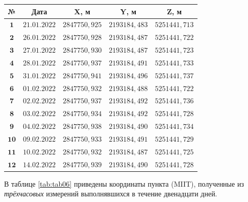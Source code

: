 \begin{table} [htbp]
	\centering\small
	\label{tab:tab05}{%
		\begin{tabular}{|c|c|c|c|c|}
			\hline
			\textbf{№} & \textbf{Дата} & \textbf{X, м} & \textbf{Y, м} & \textbf{Z, м} \\
			\hline
			\textbf{ $\mathbf{1}$} & $21.01.2022$ & $2847750,925$ & $2193184,483$ & $5251441,713$ \\
			\hline
			\textbf{ $\mathbf{2}$} & $26.01.2022$ & $2847750,928$ & $2193184,487$ & $5251441,722$ \\
			\hline
			\textbf{ $\mathbf{3}$} & $27.01.2022$ & $2847750,930$ & $2193184,487$ & $5251441,723$ \\
			\hline
			\textbf{ $\mathbf{4}$} & $28.01.2022$ & $2847750,937$ & $2193184,491$ & $5251441,733$ \\
			\hline
			\textbf{ $\mathbf{5}$} & $31.01.2022$ & $2847750,941$ & $2193184,496$ & $5251441,737$ \\
			\hline
			\textbf{ $\mathbf{6}$} & $01.02.2022$ & $2847750,932$ & $2193184,488$ & $5251441,722$ \\
			\hline
			\textbf{ $\mathbf{7}$} & $02.02.2022$ & $2847750,937$ & $2193184,492$ & $5251441,736$ \\
			\hline
			\textbf{ $\mathbf{8}$} & $03.02.2022$ & $2847750,934$ & $2193184,492$ & $5251441,728$ \\
			\hline
			\textbf{ $\mathbf{9}$} & $04.02.2022$ & $2847750,938$ & $2193184,490$ & $5251441,734$ \\
			\hline
			\textbf{$\mathbf{10}$} & $09.02.2022$ & $2847750,933$ & $2193184,491$ & $5251441,729$ \\
			\hline
			\textbf{$\mathbf{11}$} & $10.02.2022$ & $2847750,932$ & $2193184,487$ & $5251441,725$ \\
			\hline
			\textbf{$\mathbf{12}$} & $14.02.2022$ & $2847750,939$ & $2193184,490$ & $5251441,728$ \\
			\hline
		\end{tabular}
	}
\end{table}

В таблице \cref{tab:tab06} приведены координаты пункта (MIIT), полученные из \textit{трёхчасовых} измерений выполнявшихся в течение двенадцати дней.

